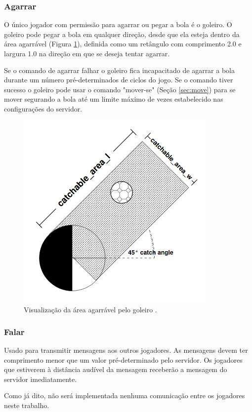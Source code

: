 \subsubsection{Agarrar}

O único jogador com permissão para agarrar ou pegar a bola é o goleiro. O goleiro pode pegar a bola em qualquer direção, desde que ela esteja dentro da área agarrável (Figura \ref{fig:catch}), definida como um retângulo com comprimento 2.0 e largura 1.0 na direção em que se deseja tentar agarrar.

Se o comando de agarrar falhar o goleiro fica incapacitado de agarrar a bola durante um número pré-determinados de ciclos do jogo. Se o comando tiver sucesso o goleiro pode usar o comando "mover-se" (Seção \ref{sec:move}) para se mover segurando a bola até um limite máximo de vezes estabelecido nas configurações do servidor.

\begin{figure}[H]
	\includegraphics[width=0.5\linewidth]{figs/catch.png}
	\centering
	\caption{Visualização da área agarrável pelo goleiro \cite{rcssmanual2003}.}
	\label{fig:catch}
\end{figure}

\subsubsection{Falar}

Usado para transmitir mensagens aos outros jogadores. As mensagens devem ter comprimento menor que um valor pré-determinado pelo servidor. Os jogadores que estiverem à distância audível da mensagem receberão a mensagem do servidor imediatamente.

Como já dito, não será implementada nenhuma comunicação entre os jogadores neste trabalho.

